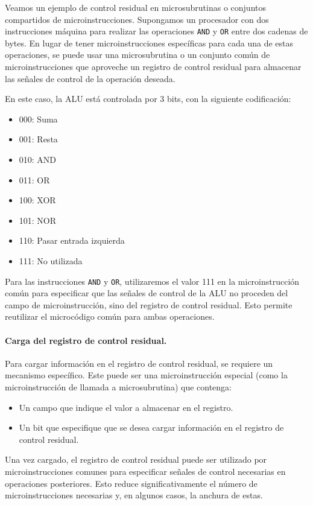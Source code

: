 \begin{ejemplo}
    Veamos un ejemplo de control residual en microsubrutinas o conjuntos compartidos de microinstrucciones. Supongamos un procesador con dos instrucciones máquina para realizar las operaciones \texttt{AND} y \texttt{OR} entre dos cadenas de bytes. En lugar de tener microinstrucciones específicas para cada una de estas operaciones, se puede usar una microsubrutina o un conjunto común de microinstrucciones que aproveche un registro de control residual para almacenar las señales de control de la operación deseada.

    En este caso, la ALU está controlada por 3 bits, con la siguiente codificación:
    \begin{itemize}
        \item 000: Suma
        \item 001: Resta
        \item 010: AND
        \item 011: OR
        \item 100: XOR
        \item 101: NOR
        \item 110: Pasar entrada izquierda
        \item 111: No utilizada
    \end{itemize}
    Para las instrucciones \texttt{AND} y \texttt{OR}, utilizaremos el valor 111 en la microinstrucción común para especificar que las señales de control de la ALU no proceden del campo de microinstrucción, sino del registro de control residual. Esto permite reutilizar el microcódigo común para ambas operaciones.
\end{ejemplo}

\paragraph{Carga del registro de control residual.} 
Para cargar información en el registro de control residual, se requiere un mecanismo específico. Este puede ser una microinstrucción especial (como la microinstrucción de llamada a microsubrutina) que contenga:
\begin{itemize}
    \item Un campo que indique el valor a almacenar en el registro.
    \item Un bit que especifique que se desea cargar información en el registro de control residual.
\end{itemize}

Una vez cargado, el registro de control residual puede ser utilizado por microinstrucciones comunes para especificar señales de control necesarias en operaciones posteriores. Esto reduce significativamente el número de microinstrucciones necesarias y, en algunos casos, la anchura de estas.


